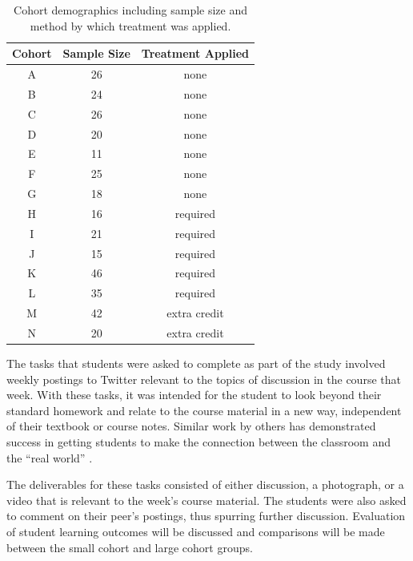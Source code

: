 \documentclass[12pt]{article}
\begin{document}
\begin{table}[H]
\caption{Cohort demographics including sample size and method by which treatment was applied.}
\begin{center}
\label{cohortDemo}
\begin{tabular}{ccc}
\hline
 Cohort & Sample Size & Treatment Applied \\
\hline
 A & 26 & none \\ 
 B & 24 & none \\ 
 C & 26 & none \\ 
 D & 20 & none \\ 
 E & 11 & none \\ 
 F & 25 & none \\
 G & 18 & none \\
 H & 16 & required \\ 
 I & 21 & required \\ 
 J & 15 & required \\ 
 K & 46 & required \\ 
 L & 35 & required \\ 
 M & 42 & extra credit \\ 
 N & 20 & extra credit \\ 
\hline
\end{tabular}
\end{center}
\end{table}

The tasks that students were asked to complete as part of the study involved weekly postings to Twitter relevant to the topics of discussion in the course that week. With these tasks, it was intended for the student to look beyond their standard homework and relate to the course material in a new way, independent of their textbook or course notes. Similar work by others has demonstrated success in getting students to make the connection between the classroom and the ``real world'' \cite{hopp_journal_2008}.

The deliverables for these tasks consisted of either discussion, a photograph, or a video that is relevant to the week's course material. The students were also asked to comment on their peer's postings, thus spurring further discussion. Evaluation of student learning outcomes will be discussed and comparisons will be made between the small cohort and large cohort groups.
\end{document}
